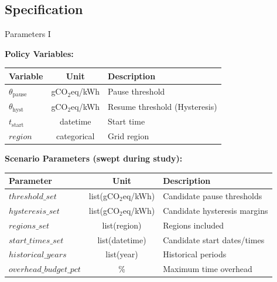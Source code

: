 \subsection{Specification}

\begin{frame}[t]{Parameters I}{}

  \small

  \textbf{Policy Variables:}
  \newline
  \begin{tabular}{l|c|l}
    \toprule
    Variable & Unit & Description \\
    \midrule
    $\theta_{\text{pause}}$ & gCO$_2$eq/kWh & Pause threshold \\
    $\theta_{\text{hyst}}$ & gCO$_2$eq/kWh & Resume threshold (Hysteresis) \\
    $t_{\text{start}}$ & datetime & Start time \\
    $\mathit{region}$ & categorical & Grid region \\
    \bottomrule
  \end{tabular}%

  \vspace{1cm}

  \textbf{Scenario Parameters (swept during study):}
  \newline
  \begin{tabular}{l|c|l}
    \toprule
    Parameter & Unit & Description \\
    \midrule
    $\mathit{threshold\_set}$ & list(gCO$_2$eq/kWh) & Candidate pause
    thresholds \\
    $\mathit{hysteresis\_set}$ & list(gCO$_2$eq/kWh) & Candidate
    hysteresis margins \\
    $\mathit{regions\_set}$ & list(region) & Regions included \\
    $\mathit{start\_times\_set}$ & list(datetime) & Candidate start
    dates/times \\
    $\mathit{historical\_years}$ & list(year) & Historical periods \\
    $\mathit{overhead\_budget\_pct}$ & \% & Maximum time overhead \\
    \bottomrule
  \end{tabular}%

\end{frame}
